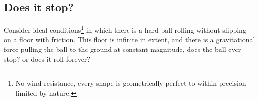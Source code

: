 \subsection{Does it stop?}
Consider ideal conditions\footnote{No wind resistance, every shape is geometrically perfect to within precision limited by nature.} in which there is a hard ball rolling without slipping on a floor with friction. This floor is infinite in extent, and there is a gravitational force pulling the ball to the ground at constant magnitude, does the ball ever stop? or does it roll forever?
